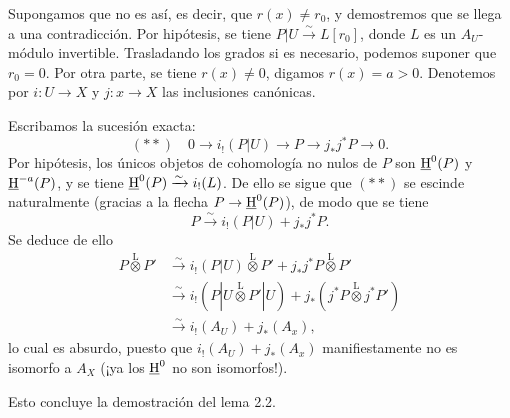 Supongamos que no es así, es decir, que $r(x) \neq r_0$, y demostremos que se llega a una contradicción. Por hipótesis, se tiene $P|U \xrightarrow{\sim} L[r_0]$, donde $L$ es un $A_U$-módulo invertible. Trasladando los grados si es necesario, podemos suponer que $r_0 = 0$. Por otra parte, se tiene $r(x) \neq 0$, digamos $r(x) = a > 0$. Denotemos por $i : U \to X$ y $j : x \to X$ las inclusiones canónicas.

Escribamos la sucesión exacta:
\[
(**) \quad 0 \longrightarrow i_{!}(P|U) \longrightarrow P \longrightarrow j_{*}j^{*}P \longrightarrow 0.
\]
Por hipótesis, los únicos objetos de cohomología no nulos de $P$ son $\underline{\mathrm H}^{0}(P)$ y $\underline{\mathrm H}^{-a}(P)$, y se tiene $\underline{\mathrm H}^{0}(P) \xrightarrow{\sim} i_{!}(L)$. De ello se sigue que $(**)$ se escinde naturalmente (gracias a la flecha $P \to \underline{\mathrm H}^{0}(P)$), de modo que se tiene
\[
P \xrightarrow{\sim} i_{!}(P|U) + j_{*}j^{*}P.
\]
Se deduce de ello
\begin{align*}
P \mathop{\otimes}\limits^{\mathrm{L}} P' &\xrightarrow{\sim} i_{!}(P|U) \mathop{\otimes}\limits^{\mathrm{L}} P' + j_{*}j^{*}P \mathop{\otimes}\limits^{\mathrm{L}} P' \\
&\xrightarrow{\sim} i_{!}(P|U \mathop{\otimes}\limits^{\mathrm{L}} P'|U) + j_{*}(j^{*}P \mathop{\otimes}\limits^{\mathrm{L}} j^{*}P') \\
&\xrightarrow{\sim} i_{!}(A_U) + j_{*}(A_x),
\end{align*}
lo cual es absurdo, puesto que $i_{!}(A_U) + j_{*}(A_x)$ manifiestamente no es isomorfo a $A_X$ (¡ya los $\underline{\mathrm H}^{0}$ no son isomorfos!).

Esto concluye la demostración del lema 2.2.
